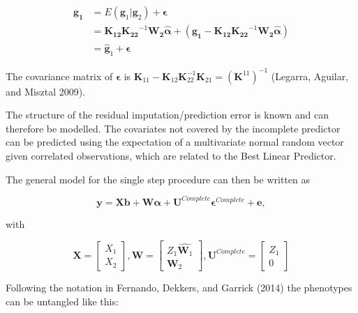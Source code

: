 \documentclass[]{elsarticle} %
\begin{document}
\begin{align} \label{eq:mrna1}
    \mathbf{g_1} &= E(\mathbf{g}_1|\mathbf{g}_2) + \boldsymbol{\epsilon} \\
    &= \mathbf{K_{12}}\mathbf{K_{22}}^{-1}\mathbf{W_2}\boldsymbol{\hat{\alpha}} + (\mathbf{g_1} - \mathbf{K_{12}}\mathbf{K_{22}}^{-1}\mathbf{W_2}\boldsymbol{\hat{\alpha}}) \\
    &= \mathbf{\hat{g}}_1 + \boldsymbol{\epsilon}
\end{align}

The covariance matrix of \(\boldsymbol{\epsilon}\) is
\(\mathbf{K}_{11} - \mathbf{K}_{12}\mathbf{K}_{22}^{-1}\mathbf{K}_{21} = (\mathbf{K}^{11})^{-1}\)
(Legarra, Aguilar, and Misztal 2009).

The structure of the residual imputation/prediction error is known and
can therefore be modelled. The covariates not covered by the incomplete
predictor can be predicted using the expectation of a multivariate
normal random vector given correlated observations, which are related to
the Best Linear Predictor.

The general model for the single step procedure can then be written as

\begin{equation}
  \label{eq:single-step-model}
\mathbf{y} = \mathbf{Xb} + \mathbf{W} \boldsymbol{\alpha} + \mathbf{U}^{Complete} \boldsymbol{\epsilon}^{Complete} + \mathbf{e},
\end{equation}

with

\begin{equation}
 \label{eq:single-step-submatrices}
\mathbf{X} = 
\begin{bmatrix}
  X_1 \\
  X_2 
 \end{bmatrix},
 \mathbf{W} = 
\begin{bmatrix}
  Z_1\hat{\mathbf{W}_1} \\
  \mathbf{W}_2 
 \end{bmatrix},
 \mathbf{U}^{Complete} = 
\begin{bmatrix}
  Z_1 \\
  0 
 \end{bmatrix}
\end{equation}

Following the notation in Fernando, Dekkers, and Garrick (2014) the
phenotypes can be untangled like this:
\end{document}
